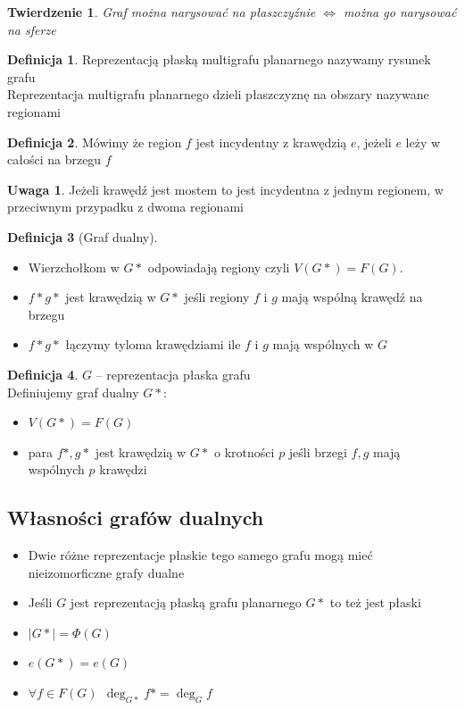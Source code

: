 \documentclass[12pt,a4paper]{article}
\newtheorem{tw}{Twierdzenie}
\theoremstyle{definition}
\newtheorem{df}{Definicja}
\newtheorem{uwaga}{Uwaga}
\begin{document}
\begin{tw}
Graf można narysować na płaszczyźnie $\Leftrightarrow$ można go narysować na sferze
\end{tw}

\begin{df}
Reprezentacją płaską multigrafu planarnego nazywamy rysunek grafu\\
Reprezentacja multigrafu planarnego dzieli płaszczyznę na obszary nazywane regionami
\end{df}

\begin{df}
Mówimy że region $f$ jest incydentny z krawędzią $e$, jeżeli $e$ leży w całości na brzegu $f$
\end{df}

\begin{uwaga}
Jeżeli krawędź jest mostem to jest incydentna z jednym regionem, w przeciwnym przypadku z dwoma regionami
\end{uwaga}

\begin{df}[Graf dualny]~\\
\begin{itemize}
	\item Wierzchołkom w $G*$ odpowiadają regiony czyli $V(G*) = F(G)$.
	\item $f*g*$ jest krawędzią w $G*$ jeśli regiony $f$ i $g$ mają wspólną krawędź na brzegu
	\item $f*g*$ łączymy tyloma krawędziami ile $f$ i $g$ mają wspólnych w $G$
\end{itemize}
\end{df}



\begin{df}
$G$ -- reprezentacja płaska grafu\\
Definiujemy graf dualny $G*$:
\begin{itemize}
	\item $V(G*) = F(G)$
	\item para $f*,g*$ jest krawędzią w $G*$ o krotności $p$ jeśli brzegi $f,g$ mają wspólnych $p$ krawędzi
\end{itemize}
\end{df}

\subsection{Własności grafów dualnych}
\begin{itemize}
	\item Dwie różne reprezentacje płaskie tego samego grafu mogą mieć nieizomorficzne grafy dualne
	\item Jeśli $G$ jest reprezentacją płaską grafu planarnego $G*$ to też jest płaski
	\item $|G*| = \Phi(G)$
	\item $e(G*) = e(G)$
	\item $\forall f\in F(G) ~~ \deg_{G*}f* = \deg_Gf$
\end{itemize}
\end{document}
